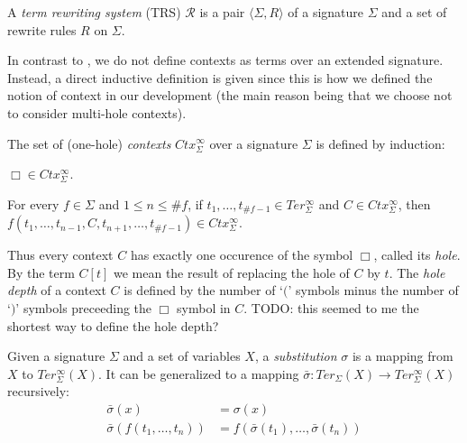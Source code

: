 \begin{definition}%
A \emph{term rewriting system} (TRS) $\mathcal{R}$ is a pair $\langle \Sigma,
R \rangle$ of a signature $\Sigma$ and a set of rewrite rules $R$ on
$\Sigma$.
\end{definition}

In contrast to \cite{terese-03}, we do not define contexts as terms over an
extended signature. Instead, a direct inductive definition is given since this
is how we defined the notion of context in our \Coq development (the main
reason being that we choose not to consider multi-hole contexts).

\begin{definition}%
The set of (one-hole) \emph{contexts} $Ctx_\Sigma^\infty$ over a signature
$\Sigma$ is defined by induction:
\begin{compactenum}
  \item
    $\Box \in Ctx_\Sigma^\infty$.
  \item
    For every $f \in \Sigma$ and $1 \le n \le \#f$, if $t_1, \ldots, t_{\#f -
      1} \in Ter_\Sigma^\infty$ and $C \in Ctx_\Sigma^\infty$, then $f(t_1,
    \ldots, t_{n - 1}, C, t_{n + 1}, \ldots, t_{\#f - 1}) \in
    Ctx_\Sigma^\infty$.
\end{compactenum}
\end{definition}

Thus every context $C$ has exactly one occurence of the symbol $\Box$, called
its \emph{hole}. By the term $C[t]$ we mean the result of replacing the hole
of $C$ by $t$. The \emph{hole depth} of a context $C$ is defined by the number
of `$($' symbols minus the number of `$)$' symbols preceeding the $\Box$
symbol in $C$.
TODO: this seemed to me the shortest way to define the hole depth?

\begin{definition}%
Given a signature $\Sigma$ and a set of variables $X$, a \emph{substitution}
$\sigma$ is a mapping from $X$ to $Ter_\Sigma^\infty(X)$. It can be
generalized to a mapping $\bar{\sigma} : Ter_\Sigma(X) \rightarrow
Ter_\Sigma^\infty(X)$ recursively:
\begin{align*}
  \bar{\sigma}(x) &= \sigma(x)\\
  \bar{\sigma}(f(t_1, \ldots, t_n)) &= f(\bar{\sigma}(t_1), \ldots,
  \bar{\sigma}(t_n))
\end{align*}
\end{definition}

